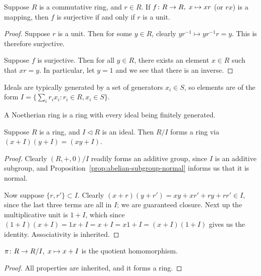 \begin{lemma}
    Suppose \(R\) is a commutative ring, and \(r \in R\).
    If \(f\colon R\to R,\;x\mapsto xr\) (or \(rx\)) is a mapping,
    then \(f\) is surjective if and only if \(r\) is a unit.
\end{lemma}
\begin{proof}
    Suppose \(r\) is a unit.
    Then for some \(y \in R\),
    clearly \(yr^{-1} \mapsto yr^{-1}r = y\).
    This is therefore surjective.

    Suppose \(f\) is surjective.
    Then for all \(y \in R\),
    there exists an element \(x \in R\) such that \(xr = y\).
    In particular, let \(y = 1\) and we see that there is an inverse.
\end{proof}
\begin{remark}
    Ideals are typically generated by a set of generators \(x_i \in S\),
    so elements are of the form
    \(I = \{\sum_i r_i x_i : r_i \in R, x_i \in S\}\).
\end{remark}
\begin{definition}
    A Noetherian ring is a ring with every ideal being finitely generated.
\end{definition}

\begin{lemma}
    Suppose \(R\) is a ring, and \(I \lhd R\) is an ideal.
    Then \(R/I\) forms a ring via \((x+I)(y+I) = (xy+I)\).
\end{lemma}
\begin{proof}
    Clearly \((R,+,0)/I\) readily forms an additive group,
    since \(I\) is an additive subgroup,
    and Proposition~\ref{prop:abelian-subgroup-normal}
    informs us that it is normal.

    Now suppose \(\{r,r'\} \subset I\).
    Clearly \((x+r)(y+r') = xy + xr' + ry + rr' \in I\),
    since the last three terms are all in \(I\);
    we are guaranteed closure.
    Next up the multiplicative unit is \(1+I\),
    which since \((1+I)(x+I) = 1x+I = x+I = x1+I = (x+I)(1+I)\)
    gives us the identity.
    Associativity is inherited.
\end{proof}
\begin{corollary}
    \(\pi\colon R\to R/I,\;x\mapsto x+I\) is the quotient homomorphism.
\end{corollary}
\begin{proof}
    All properties are inherited, and it forms a ring.
\end{proof}

